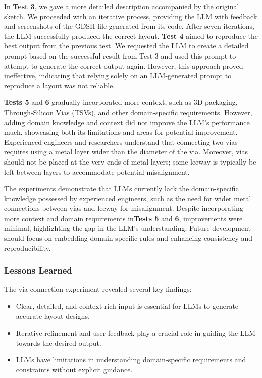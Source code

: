 \documentclass{article}
\begin{document}
In \textbf{Test 3}, we gave a more detailed description accompanied by the original sketch. We proceeded with an iterative process, providing the LLM with feedback and screenshots of the GDSII file generated from its code. After seven iterations, the LLM successfully produced the correct layout. \textbf{Test 4} aimed to reproduce the best output from the previous test. We requested the LLM to create a detailed prompt based on the successful result from Test 3 and used this prompt to attempt to generate the correct output again. However, this approach proved ineffective, indicating that relying solely on an LLM-generated prompt to reproduce a layout was not reliable.

\textbf{Tests 5} and \textbf{6} gradually incorporated more context, such as 3D packaging, Through-Silicon Vias (TSVs), and other domain-specific requirements. However, adding domain knowledge and context did not improve the LLM's performance much, showcasing both its limitations and areas for potential improvement.  Experienced engineers and researchers understand that connecting two vias requires using a metal layer wider than the diameter of the via. Moreover, vias should not be placed at the very ends of metal layers; some leeway is typically be left between layers to accommodate potential misalignment. %

The experiments demonstrate that LLMs currently lack the domain-specific knowledge possessed by experienced engineers, such as the need for wider metal connections between vias and leeway for misalignment. Despite incorporating more context and domain requirements in\textbf{Tests 5} and \textbf{6}, improvements were minimal, highlighting the gap in the LLM's understanding. Future development should focus on embedding domain-specific rules and enhancing consistency and reproducibility.



\subsubsection{Lessons Learned}
The via connection experiment revealed several key findings:
\begin{itemize}
\item Clear, detailed, and context-rich input is essential for LLMs to generate accurate layout designs.
\item Iterative refinement and user feedback play a crucial role in guiding the LLM towards the desired output.
\item LLMs have limitations in understanding domain-specific requirements and constraints without explicit guidance.
\end{itemize}
\end{document}

